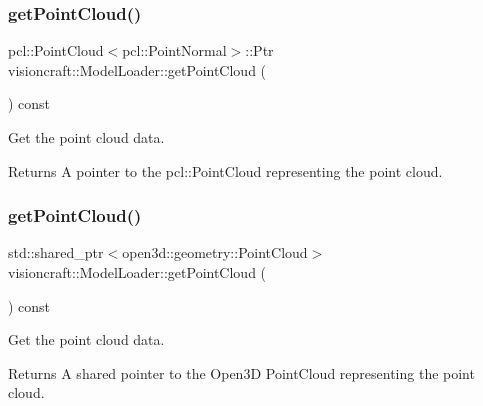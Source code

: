 \subsubsection{\texorpdfstring{get\+Point\+Cloud()}{getPointCloud()}\hspace{0.1cm}{\footnotesize\ttfamily [1/2]}}
{\footnotesize\ttfamily pcl\+::\+Point\+Cloud$<$pcl\+::\+Point\+Normal$>$\+::Ptr visioncraft\+::\+Model\+Loader\+::get\+Point\+Cloud (\begin{DoxyParamCaption}{ }\end{DoxyParamCaption}) const\hspace{0.3cm}{\ttfamily [inline]}}



Get the point cloud data. 

\begin{DoxyReturn}{Returns}
A pointer to the pcl\+::\+Point\+Cloud representing the point cloud. 
\end{DoxyReturn}
\mbox{\label{classvisioncraft_1_1ModelLoader_a7bbb30715d96a5f0528f1ea020e77fe1}} 
\subsubsection{\texorpdfstring{get\+Point\+Cloud()}{getPointCloud()}\hspace{0.1cm}{\footnotesize\ttfamily [2/2]}}
{\footnotesize\ttfamily std\+::shared\+\_\+ptr$<$open3d\+::geometry\+::\+Point\+Cloud$>$ visioncraft\+::\+Model\+Loader\+::get\+Point\+Cloud (\begin{DoxyParamCaption}{ }\end{DoxyParamCaption}) const\hspace{0.3cm}{\ttfamily [inline]}}



Get the point cloud data. 

\begin{DoxyReturn}{Returns}
A shared pointer to the Open3D Point\+Cloud representing the point cloud. 
\end{DoxyReturn}
\mbox{\label{classvisioncraft_1_1ModelLoader_ae6f4b53ca7b10ddfda1516120184da2f}} 
